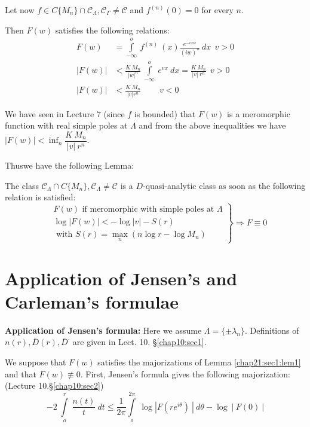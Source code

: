 Let now $f \in C\{M_n\}\cap
\mathscr{C}_{\Lambda},\mathscr{C}_{\Gamma}\neq \mathscr{C}$ and
$f^{(n)}(0)=0$ for every $n$. 

Then $F(w)$ satisfies the following relations:
\begin{align*}
 F(w) & = \int\limits_{-\infty}^o ~ f^{(n)} ~ (x)
 \frac{e^{-ixw}}{(iw)^n} ~ dx ~~ v > 0\\ 
 | F(w)| &< \frac{K ~ M_n}{|w|^n} ~ \int\limits_{-\infty}^o ~
 e^{vx} ~ dx = \frac{K ~ M_n}{|v| ~r^n} ~ ~v > 0\\ 
 | F(w)| & < \frac{K ~ M_n}{| v | r^n} ~ \qquad v < 0
\end{align*}

We have seen in Lecture $7$ (since $f$ is bounded) that $F(w)$ is a
meromorphic function with real simple poles at $\Lambda$ and from the
above inequalities we have $|F(w) | < \inf_{n} \dfrac{K ~ M_n}{|v| ~
 r^n}$. 

Thus\pageoriginale we have the following Lemma: 

\begin{lem}\label{chap21:sec1:lem2}%
 The class $\mathscr{C}_\Lambda \cap C\{M_n \}, \mathscr{C}_\Lambda
 \neq \mathscr{C}$ is a $D$-quasi-analytic class as soon as the
 following relation is satisfied: 
 \begin{equation*}
 \left.
 \begin{aligned}
  &F(w) \text{ if meromorphic with simple poles at }\Lambda\\
  &\log | F(w) | < - \log | v | - S(r) \\
  &\text{ with } S(r) = \max_n (n \log r - \log M_n) 
 \end{aligned}
 \right \}
 \Rightarrow F \equiv 0
 \end{equation*}
\end{lem}

\section{Application of Jensen's and Carleman's formulae}\label{chap21:sec2}%

\textbf{Application of Jensen's formula:} Here we assume $\Lambda =
\{\pm \lambda_n \}$. Definitions of $n(r),\bar{D}(r),\bar{D}^.$ are
given in Lect. 10. \S \ref{chap10:sec1}. 

We suppose that $F(w)$ satisfies the majorizations of Lemma
\ref{chap21:sec1:lem1}  and
that $F(w) \nequiv 0$. First, Jensen's formula gives the following
majorization: (Lecture 10.\S \ref{chap10:sec2}) 
$$
-2 ~ \int\limits_o^r ~ \frac{n(t)}{t} ~ dt \le \frac{1}{2\pi}
\int\limits_o^{2\pi} ~ \log | F(re^{i\theta}) ~ | ~ d\theta - \log ~ |
~F(0) ~ | 
$$

